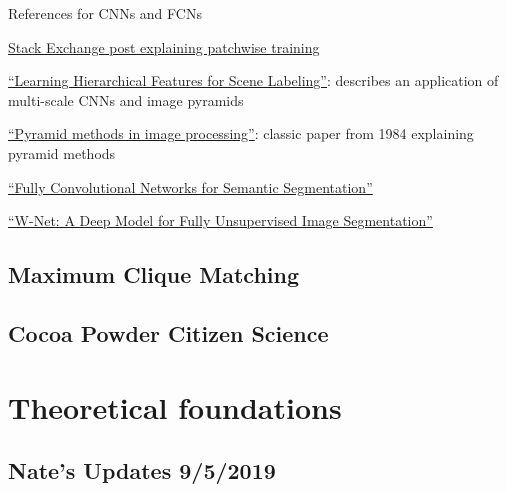 \documentclass[]{book}
\begin{document}
References for CNNs and FCNs

\href{https://stats.stackexchange.com/questions/266075/patch-wise-training-and-fully-convolutional-training-in-fully-convolutional-neur}{Stack Exchange post explaining patchwise training}

\href{https://ieeexplore.ieee.org/abstract/document/6338939}{``Learning Hierarchical Features for Scene Labeling''}: describes an application of multi-scale CNNs and image pyramids

\href{http://citeseerx.ist.psu.edu/viewdoc/summary?doi=10.1.1.56.8646}{``Pyramid methods in image processing''}: classic paper from 1984 explaining pyramid methods

\href{https://people.eecs.berkeley.edu/~jonlong/long_shelhamer_fcn.pdf}{``Fully Convolutional Networks for Semantic Segmentation''}

\href{https://arxiv.org/pdf/1711.08506.pdf}{``W-Net: A Deep Model for Fully Unsupervised Image Segmentation''}

\hypertarget{maxclique}{%
\section{Maximum Clique Matching}\label{maxclique}}

\hypertarget{cocoa}{%
\section{Cocoa Powder Citizen Science}\label{cocoa}}

\hypertarget{theoretical-foundations}{%
\chapter{Theoretical foundations}\label{theoretical-foundations}}

\hypertarget{nates-updates-952019}{%
\section{Nate's Updates 9/5/2019}\label{nates-updates-952019}}
\end{document}

